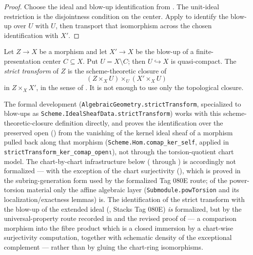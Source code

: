 \begin{proof}
  \leanok
  Choose the ideal and blow-up identification from
  .  The unit-ideal restriction is the
  disjointness condition on the center.  Apply
   to identify the blow-up over $U$
  with $U$, then transport that isomorphism across the chosen identification
  with $X'$.
\end{proof}

\begin{definition}
  \label{def:nagata-strict-transform}
  \leanok

  Let $Z\to X$ be a morphism and let $X'\to X$ be the blow-up of a
  finite-presentation center $C\subseteq X$.  Put $U=X\setminus C$; then
  $U\hookrightarrow X$ is quasi-compact.  The \emph{strict transform} of $Z$
  is the scheme-theoretic closure of
  \[
    (Z\times_XU)\times_U(X'\times_XU)
  \]
  in $Z\times_XX'$, in the sense of
  .  It is not enough to use only
  the topological closure.
\end{definition}

\begin{remark}
  The formal development (\texttt{AlgebraicGeometry.strictTransform},
  specialized to blow-ups as
  \texttt{Scheme.IdealSheafData.strictTransform}) works with this
  scheme-theoretic-closure definition directly, and proves the identification
  over the preserved open ()
  from the vanishing of the kernel ideal sheaf of a morphism pulled back
  along that morphism (\texttt{Scheme.Hom.comap\_ker\_self}, applied in
  \texttt{strictTransform\_ker\_comap\_openι}), not through the
  torsion-quotient chart model.  The chart-by-chart infrastructure below
  ( through
  ) is accordingly
  not formalized — with the exception of the chart surjectivity
  (), which is proved in the
  subring-generation form used by the formalized Tag 080E route; of the
  power-torsion material only the affine algebraic layer
  (\texttt{Submodule.powTorsion} and its localization/exactness lemmas) is.
  The identification of the strict transform with the blow-up of the
  extended ideal (,
  Stacks Tag 080E) \emph{is} formalized, but by the universal-property route
  recorded in  and the
  revised proof of  — a
  comparison morphism into the fibre product which is a closed immersion by
  a chart-wise surjectivity computation, together with schematic density of
  the exceptional complement — rather than by gluing the chart-ring
  isomorphisms.
\end{remark}

